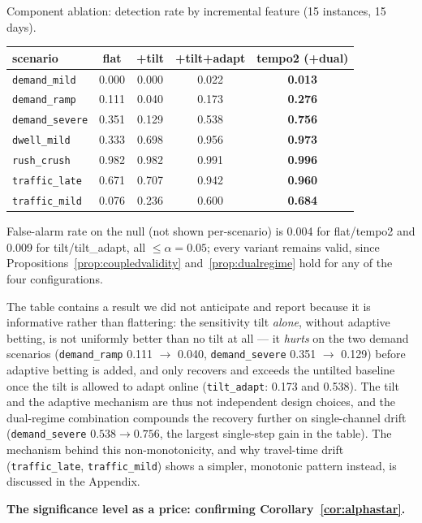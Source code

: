 \documentclass[trsc,dblanonrev]{informs4}
\begin{document}
\begin{table}
\TABLE
{Component ablation: detection rate by incremental feature (15
instances, 15 days).\label{tab:ablation}}
{\footnotesize\begin{tabular}{@{}lcccc@{}}
\toprule
scenario & flat & +tilt & +tilt+adapt & \textbf{tempo2 (+dual)} \\
\midrule
\texttt{demand\_mild}   & 0.000 & 0.000 & 0.022 & \textbf{0.013} \\
\texttt{demand\_ramp}   & 0.111 & 0.040 & 0.173 & \textbf{0.276} \\
\texttt{demand\_severe} & 0.351 & 0.129 & 0.538 & \textbf{0.756} \\
\texttt{dwell\_mild}    & 0.333 & 0.698 & 0.956 & \textbf{0.973} \\
\texttt{rush\_crush}    & 0.982 & 0.982 & 0.991 & \textbf{0.996} \\
\texttt{traffic\_late}  & 0.671 & 0.707 & 0.942 & \textbf{0.960} \\
\texttt{traffic\_mild}  & 0.076 & 0.236 & 0.600 & \textbf{0.684} \\
\bottomrule
\end{tabular}}
{False-alarm rate on the null (not shown per-scenario) is 0.004 for
flat/tempo2 and 0.009 for tilt/tilt\_adapt, all $\le \alpha = 0.05$;
every variant remains valid, since Propositions~\ref{prop:coupledvalidity}
and~\ref{prop:dualregime} hold for any of the four configurations.}
\end{table}

The table contains a result we did not anticipate and report because it
is informative rather than flattering: the sensitivity tilt
\emph{alone}, without adaptive betting, is not uniformly better than no
tilt at all --- it \emph{hurts} on the two demand scenarios
(\texttt{demand\_ramp} 0.111 $\to$ 0.040, \texttt{demand\_severe} 0.351
$\to$ 0.129) before adaptive betting is added, and only recovers and
exceeds the untilted baseline once the tilt is allowed to adapt online
(\texttt{tilt\_adapt}: 0.173 and 0.538). The tilt and the adaptive
mechanism are thus not independent design choices, and the dual-regime
combination compounds the recovery further on single-channel drift
(\texttt{demand\_severe} $0.538 \to 0.756$, the largest single-step
gain in the table). The mechanism behind this non-monotonicity, and why
travel-time drift (\texttt{traffic\_late}, \texttt{traffic\_mild})
shows a simpler, monotonic pattern instead, is discussed in the
Appendix.

\textbf{The significance level as a price: confirming Corollary~\ref{cor:alphastar}.}
\end{document}
